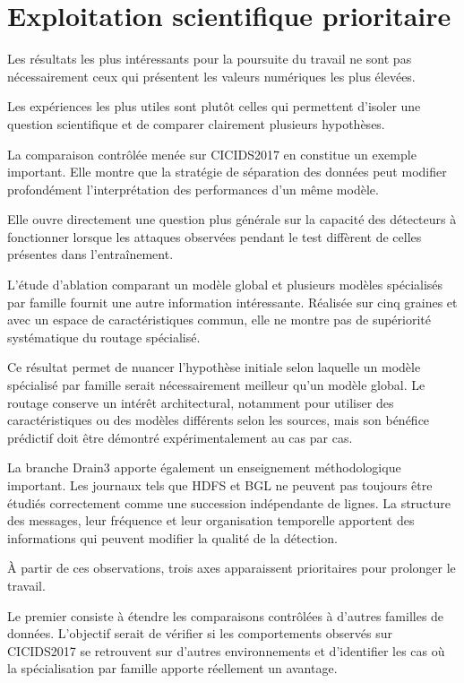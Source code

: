 \section{Exploitation scientifique prioritaire}

Les résultats les plus intéressants pour la poursuite du travail ne sont pas nécessairement ceux qui présentent les valeurs numériques les plus élevées.

Les expériences les plus utiles sont plutôt celles qui permettent d'isoler une question scientifique et de comparer clairement plusieurs hypothèses.

La comparaison contrôlée menée sur CICIDS2017 en constitue un exemple important. Elle montre que la stratégie de séparation des données peut modifier profondément l'interprétation des performances d'un même modèle.

Elle ouvre directement une question plus générale sur la capacité des détecteurs à fonctionner lorsque les attaques observées pendant le test diffèrent de celles présentes dans l'entraînement.

L'étude d'ablation comparant un modèle global et plusieurs modèles spécialisés par famille fournit une autre information intéressante. Réalisée sur cinq graines et avec un espace de caractéristiques commun, elle ne montre pas de supériorité systématique du routage spécialisé.

Ce résultat permet de nuancer l'hypothèse initiale selon laquelle un modèle spécialisé par famille serait nécessairement meilleur qu'un modèle global. Le routage conserve un intérêt architectural, notamment pour utiliser des caractéristiques ou des modèles différents selon les sources, mais son bénéfice prédictif doit être démontré expérimentalement au cas par cas.

La branche Drain3 apporte également un enseignement méthodologique important. Les journaux tels que HDFS et BGL ne peuvent pas toujours être étudiés correctement comme une succession indépendante de lignes. La structure des messages, leur fréquence et leur organisation temporelle apportent des informations qui peuvent modifier la qualité de la détection.

À partir de ces observations, trois axes apparaissent prioritaires pour prolonger le travail.

Le premier consiste à étendre les comparaisons contrôlées à d'autres familles de données. L'objectif serait de vérifier si les comportements observés sur CICIDS2017 se retrouvent sur d'autres environnements et d'identifier les cas où la spécialisation par famille apporte réellement un avantage.

